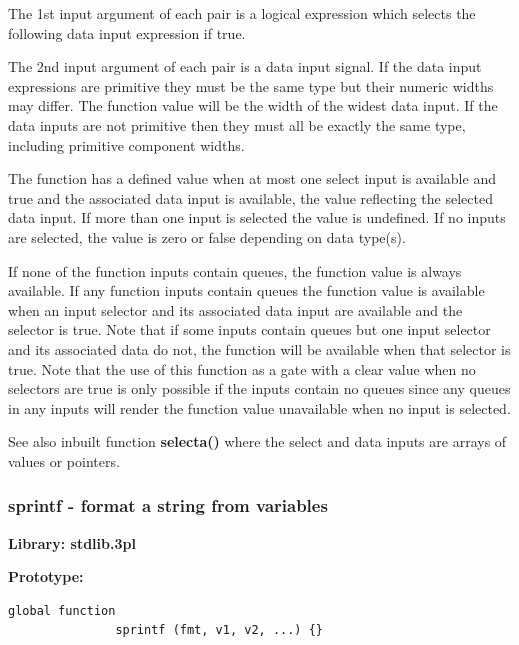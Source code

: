             The 1st input argument of each pair is a logical expression which
            selects the following data input expression if true.

            The 2nd input argument of each pair is a data input signal. If the
            data input expressions are primitive they must be the same type but
            their numeric widths may differ. The function value will be the
            width of the widest data input. If the data inputs are not
            primitive then they must all be exactly the same type, including
            primitive component widths.

            The function has a defined value when at most one select input
            is available and true and the associated data input is available,
            the value reflecting the selected data input. If more than one
            input is selected the value is undefined. If no inputs are
            selected, the value is zero or false depending on data type(s).

            If none of the function inputs contain queues, the function value is
            always available. If any function inputs contain queues the function
            value is available when an input selector and its associated data
            input are available and the selector is true. Note that if some
            inputs contain queues but one input selector and its associated data
            do not, the function will be available when that selector is true.
            Note that the use of this function as a gate with a clear value
            when no selectors are true is only possible if the inputs contain
            no queues since any queues in any inputs will render the function
            value unavailable when no input is selected.
            
            See also inbuilt function {\bf selecta()} 
            where the select and data inputs are arrays of values or pointers.




        \subsubsection{sprintf - format a string from variables}\label{sec:lfsprintf}

            {\bf Library: stdlib.3pl}

            {\bf Prototype:} \\
            \vsp
            \begin{lstlisting}[gobble=12, language=threepl]
               global function
               sprintf (fmt, v1, v2, ...) {}
            \end{lstlisting}

